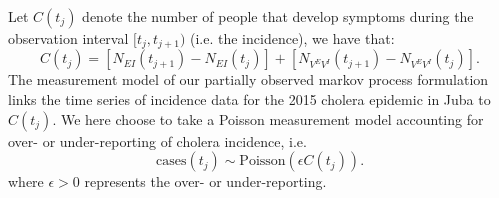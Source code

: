 Let \(C(t_j)\) denote the number of people that develop symptoms during the
observation interval \([t_j, t_{j+1})\) (i.e. the incidence), we have
that:
\begin{equation}
    C(t_j) = [N_{EI}(t_{j+1}) - N_{EI}(t_j)] + [N_{V^EV^I}(t_{j+1}) - N_{V^EV^I}(t_j)]. \label{eq:stochrep}
\end{equation}
The measurement model of our  partially observed markov process formulation links the time series of incidence data for the 2015 cholera epidemic in Juba to \(C(t_j)\). We here choose to take a Poisson measurement model accounting for over- or under-reporting of cholera incidence, i.e.
\[
	\text{cases}(t_j) \sim \text{Poisson}(\epsilon C(t_j)).
\]
where \(\epsilon > 0\) represents the over- or under-reporting.

%
